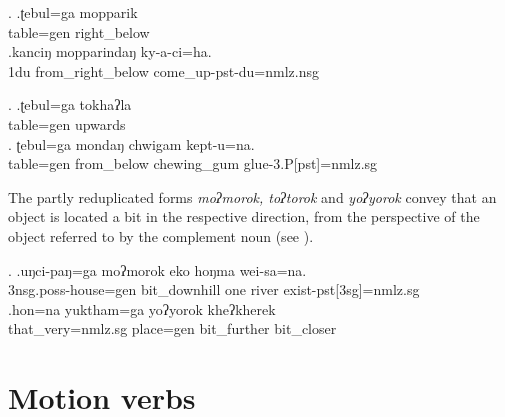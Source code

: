 \ex. \ag.ʈebul=ga mopparik\\
table{\sc =gen} right\_below\\
\bg.kanciŋ mopparindaŋ ky-a-ci=ha.\\
{\sc 1du} from\_right\_below come\_up{\sc -pst-du=nmlz.nsg}\\

\ex. \ag.ʈebul=ga tokhaʔla\\
table{\sc =gen} upwards\\
\bg. ʈebul=ga mondaŋ chwigam kept-u=na.\\
table{\sc =gen} from\_below chewing\_gum  glue{\sc -3.P[pst]=nmlz.sg}\\

The partly reduplicated forms \emph{moʔmorok, toʔtorok} and \emph{yoʔyorok} convey that an object is located a bit in the respective direction, from the perspective of the object referred to by the complement noun (see \Next).

\ex. \ag.uŋci-paŋ=ga           moʔmorok          eko hoŋma wei-sa=na.\\
{\sc 3nsg.poss-}house{\sc =gen}  bit\_downhill one river exist{\sc -pst[3sg]=nmlz.sg}\\
 
\bg.hon=na         yuktham=ga    yoʔyorok     kheʔkherek\\
that\_very{\sc =nmlz.sg} place{\sc =gen} bit\_further bit\_closer\\
 
		
		

\section{Motion verbs}\label{geomorph-verb}

